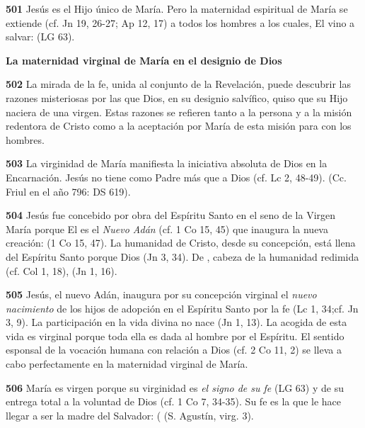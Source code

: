 \begin{body}
\begin{body}
\textbf{501} Jesús es el Hijo único de María. Pero la maternidad espiritual de María se extiende (cf. Jn 19, 26-27; Ap 12, 17) a todos los hombres a los cuales, El vino a salvar:  (LG 63).

\textbf{La maternidad virginal de María en el designio de Dios}

\textbf{502} La mirada de la fe, unida al conjunto de la Revelación, puede descubrir las razones misteriosas por las que Dios, en su designio salvífico, quiso que su Hijo naciera de una virgen. Estas razones se refieren tanto a la persona y a la misión redentora de Cristo como a la aceptación por María de esta misión para con los hombres.

\textbf{503} La virginidad de María manifiesta la iniciativa absoluta de Dios en la Encarnación. Jesús no tiene como Padre más que a Dios (cf. Lc 2, 48-49).  (Cc. Friul en el año 796: DS 619).

\textbf{504} Jesús fue concebido por obra del Espíritu Santo en el seno de la Virgen María porque El es el \emph{Nuevo Adán} (cf. 1 Co 15, 45) que inaugura la nueva creación:  (1 Co 15, 47). La humanidad de Cristo, desde su concepción, está llena del Espíritu Santo porque Dios  (Jn 3, 34). De , cabeza de la humanidad redimida (cf. Col 1, 18),  (Jn 1, 16).

\textbf{505} Jesús, el nuevo Adán, inaugura por su concepción virginal el \emph{nuevo nacimiento} de los hijos de adopción en el Espíritu Santo por la fe  (Lc 1, 34;cf. Jn 3, 9). La participación en la vida divina no nace  (Jn 1, 13). La acogida de esta vida es virginal porque toda ella es dada al hombre por el Espíritu. El sentido esponsal de la vocación humana con relación a Dios (cf. 2 Co 11, 2) se lleva a cabo perfectamente en la maternidad virginal de María.

\textbf{506} María es virgen porque su virginidad es \emph{el signo de su fe}  (LG 63) y de su entrega total a la voluntad de Dios (cf. 1 Co 7, 34-35). Su fe es la que le hace llegar a ser la madre del Salvador:  ( (S. Agustín, virg. 3).


\end{body}
\end{body}
